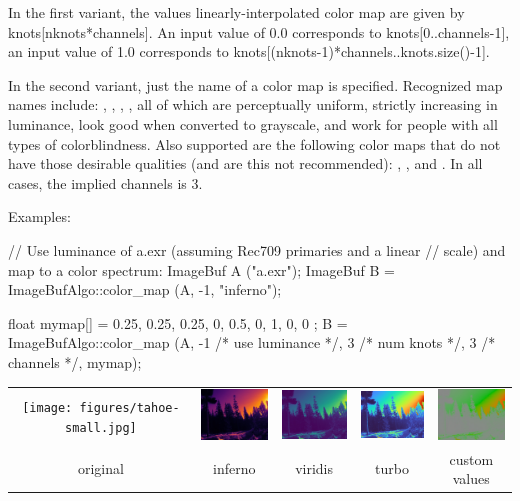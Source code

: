 In the first variant, the values linearly-interpolated color map are
given by {\cf knots[nknots*channels]}.
An input value of 0.0 corresponds to {\cf knots[0..channels-1]}, an input
value of 1.0 corresponds to {\cf knots[(nknots-1)*channels..knots.size()-1]}.

In the second variant, just the name of a color map is specified. Recognized
map names include: , , , ,
all of which are perceptually uniform, strictly increasing in luminance,
look good when converted to grayscale, and work for people with all types of
colorblindness. Also supported are the following color maps that do not have
those desirable qualities (and are this not recommended): ,
, and . In all cases, the implied {\cf channels} is
3.

\smallskip
\noindent Examples:
\begin{code}
    // Use luminance of a.exr (assuming Rec709 primaries and a linear
    // scale) and map to a color spectrum:
    ImageBuf A ("a.exr");
    ImageBuf B = ImageBufAlgo::color_map (A, -1, "inferno");

    float mymap[] = { 0.25, 0.25, 0.25,  0, 0.5, 0,  1, 0, 0 };
    B = ImageBufAlgo::color_map (A, -1 /* use luminance */,
                                 3 /* num knots */, 3 /* channels */,
                                 mymap);
\end{code}

\noindent \begin{tabular}{ccccc}
\texttt{[image: figures/tahoe-small.jpg]} &
\includegraphics[width=0.9in]{figures/colormap-inferno.jpg} &
\includegraphics[width=0.9in]{figures/colormap-viridis.jpg} &
\includegraphics[width=0.9in]{figures/colormap-turbo.jpg} &
\includegraphics[width=0.9in]{figures/colormap-custom.jpg} \\
original & inferno & viridis & turbo & custom values \\
\end{tabular}
\apiend



